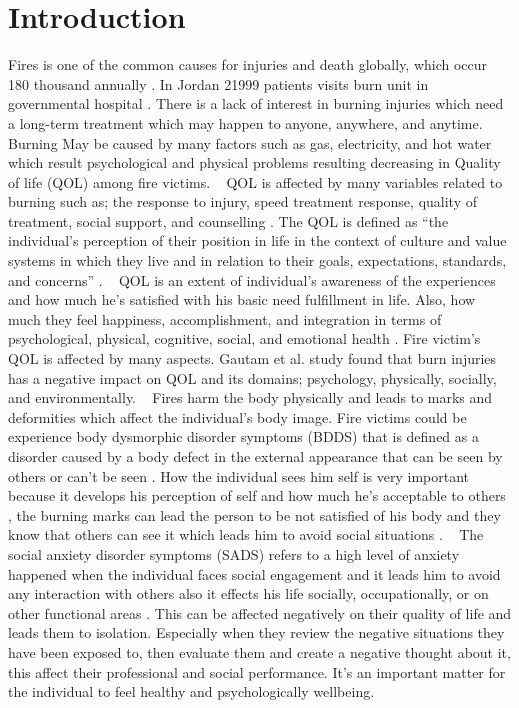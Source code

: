 \documentclass[10pt]{NSP1}
\begin{document}
	\maketitle
	\thispagestyle{titlepage} 
	\section{Introduction}
	Fires is one of the common causes for injuries and death globally, which occur 180 thousand annually \cite{WHO2023}. In Jordan 21999 patients visits burn unit in governmental hospital \cite{MOH2025}. There is a lack of interest in burning injuries which need a long-term treatment which may happen to anyone, anywhere, and anytime. Burning May be caused by many factors such as gas, electricity, and hot water which result psychological and physical problems resulting decreasing in Quality of life (QOL) among fire victims.
	~
	QOL is affected by many variables related to burning such as; the response to injury, speed treatment response, quality of treatment, social support, and counselling \cite{Hunt2012}. The QOL is defined as “the individual's perception of their position in life in the context of culture and value systems in which they live and in relation to their goals, expectations, standards, and concerns” \cite{Ho2024}.
	~
	QOL is an extent of individual's awareness of the experiences and how much he's satisfied with his basic need fulfillment in life. Also, how much they feel happiness, accomplishment, and integration in terms of psychological, physical, cognitive, social, and emotional health \cite{AlHarthi2017}. Fire victim's QOL is affected by many aspects. Gautam et al. \cite{Gautam2022} study found that burn injuries has a negative impact on QOL and its domains; psychology, physically, socially, and environmentally.
	~
	Fires harm the body physically and leads to marks and deformities which affect the individual's body image. Fire victims could be experience body dysmorphic disorder symptoms (BDDS) that is defined as a disorder caused by a body defect in the external appearance that can be seen by others or can't be seen \cite{Ruck2024}. How the individual sees him self is very important because it develops his perception of self and how much he's acceptable to others \cite{Sreshta2017}, the burning marks can lead the person to be not satisfied of his body and they know that others can see it which leads him to avoid social situations \cite{Alhammadi2020}.
	~
	The social anxiety disorder symptoms (SADS) refers to a high level of anxiety happened when the individual faces social engagement and it leads him to avoid any interaction with others also it effects his life socially, occupationally, or on other functional areas \cite{APA2013}. This can be affected negatively on their quality of life and leads them to isolation. Especially when they review the negative situations they have been exposed to, then evaluate them and create a negative thought about it, this affect their professional and social performance. It's an important matter for the individual to feel healthy and psychologically wellbeing.
\end{document}
